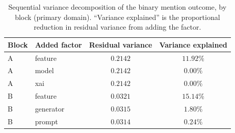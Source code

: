 \begin{table}[t]
  \centering
  \caption{Sequential variance decomposition of the binary mention outcome,
  by block (primary domain). ``Variance explained'' is the proportional
  reduction in residual variance from adding the factor.}
  \label{tab:mixed-var}
  \small
  \begin{tabular}{llcc}
    \toprule
    Block & Added factor & Residual variance & Variance explained \\
    \midrule
    A & feature & $0.2142$ & $11.92\%$ \\
    A & model & $0.2142$ & $0.00\%$ \\
    A & xai & $0.2142$ & $0.00\%$ \\
    B & feature & $0.0321$ & $15.14\%$ \\
    B & generator & $0.0315$ & $1.80\%$ \\
    B & prompt & $0.0314$ & $0.24\%$ \\
    \bottomrule
  \end{tabular}
\end{table}
